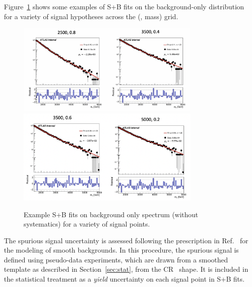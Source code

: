 Figure~\ref{fig:splusb_ex} shows some examples of S+B fits on the background-only distribution for a variety of signal hypotheses across the (\rinv, mass) grid.
\begin{figure}[!htbp]
\centering
   \includegraphics[width=0.8\textwidth]{figures/stats/splusb_ex1}
   \includegraphics[width=0.8\textwidth]{figures/stats/splusb_ex2}
    \caption{Example S+B fits on background only spectrum (without systematics) for a variety of signal points.
    \label{fig:splusb_ex}}
\end{figure}


The spurious signal uncertainty is assessed following the prescription in Ref.~\cite{ATL-PHYS-PUB-2020-028} for the modeling of smooth backgrounds.
In this procedure, the spurious signal is defined using pseudo-data experiments, which are drawn from a smoothed template as described in Section~\ref{sec:stat}, from the CR \mt~shape.
It is included in the statistical treatment as a \textit{yield} uncertainty on each signal point in S+B fits.

